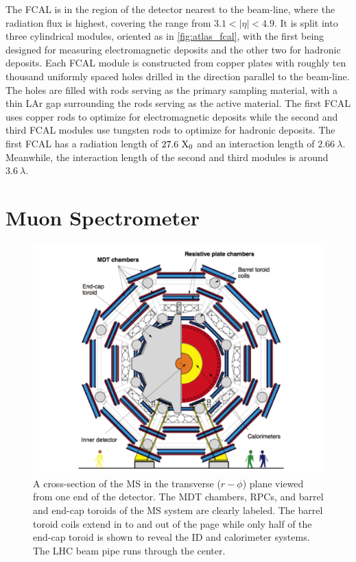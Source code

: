 The FCAL is in the region of the detector nearest to the beam-line, 
where the radiation flux is highest, covering the range
from $3.1 < |\eta| < 4.9$. It is split into three cylindrical modules,
oriented as in \fig\ref{fig:atlas_fcal}, with the first 
being designed for measuring electromagnetic deposits and the other
two for hadronic deposits.
Each FCAL module is constructed from copper plates with roughly ten thousand
uniformly spaced holes drilled in the direction parallel to the beam-line.
The holes are filled with rods serving as the primary sampling material, 
with a thin LAr gap surrounding the rods serving as the active material.
The first FCAL uses copper rods to optimize for electromagnetic deposits
while the second and third FCAL modules use tungsten rods
to optimize for hadronic deposits.
The first FCAL has a radiation length of $27.6~\textrm{X}_0$ and an 
interaction length of $2.66~\lambda$. Meanwhile, the interaction
length of the second and third modules is around $3.6~\lambda$.







\section{Muon Spectrometer}
\label{sec:atlas_ms}

\begin{figure}[ht]
\centering
\includegraphics[width=.95\textwidth]{figures/atlas/ms_rphi}
\caption{A cross-section of the MS in the 
transverse ($r-\phi$) plane viewed from one end of the detector. 
The MDT chambers, RPCs, and
barrel and end-cap toroids of the MS system are clearly labeled.
The barrel toroid coils extend in to and out of the page while only
half of the end-cap toroid is shown to reveal the ID and calorimeter
systems.  The LHC beam pipe runs through the center.}
\label{fig:atlas_ms_rphi}
\end{figure}


